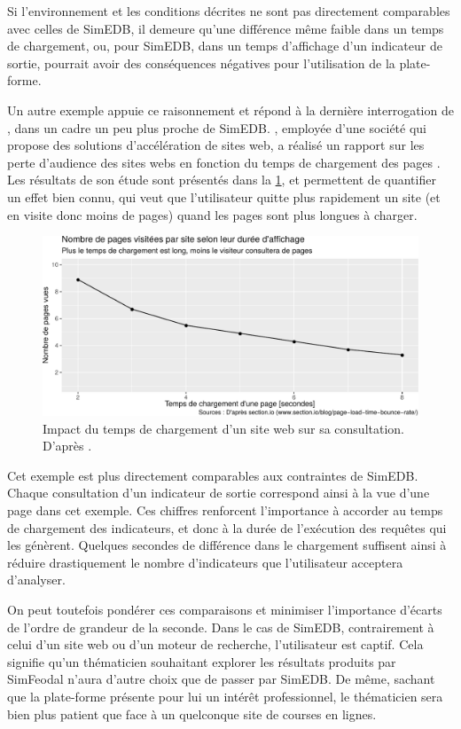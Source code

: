 Si l'environnement et les conditions décrites ne sont pas directement comparables avec celles de SimEDB, il demeure qu'une différence même faible dans un temps de chargement, ou, pour SimEDB, dans un temps d'affichage d'un indicateur de sortie, pourrait avoir des conséquences négatives pour l'utilisation de la plate-forme.

Un autre exemple appuie ce raisonnement et répond à la dernière interrogation de \citeauthor{patel_speed_2011}, dans un cadre un peu plus proche de SimEDB.
, employée d'une société qui propose des solutions d'accélération de sites web, a réalisé un rapport sur les perte d'audience des sites webs en fonction du temps de chargement des pages \autocite{elliott_how_2017}.
Les résultats de son étude sont présentés dans la \cref{fig:page-abandon}, et permettent de quantifier un effet bien connu, qui veut que l'utilisateur quitte plus rapidement un site (et en visite donc moins de pages) quand les pages sont plus longues à charger.

\begin{figure}[H]
	\centering
	\includegraphics[width=.9\linewidth]{img/abandon_pages.pdf}
	\caption{Impact du temps de chargement d'un site web sur sa consultation. D'après \textcite{elliott_how_2017}.}
	\label{fig:page-abandon}
\end{figure}

Cet exemple est plus directement comparables aux contraintes de SimEDB.
Chaque consultation d'un indicateur de sortie correspond ainsi à la vue d'une page dans cet exemple.
Ces chiffres renforcent l'importance à accorder au temps de chargement des indicateurs, et donc à la durée de l'exécution des requêtes qui les génèrent.
Quelques secondes de différence dans le chargement suffisent ainsi à réduire drastiquement le nombre d'indicateurs que l'utilisateur acceptera d'analyser.

On peut toutefois pondérer ces comparaisons et minimiser l'importance d'écarts de l'ordre de grandeur de la seconde.
Dans le cas de SimEDB, contrairement à celui d'un site web ou d'un moteur de recherche, l'utilisateur est \og captif\fg{}.
Cela signifie qu'un thématicien souhaitant explorer les résultats produits par SimFeodal n'aura d'autre choix que de passer par SimEDB.
De même, sachant que la plate-forme présente pour lui un intérêt professionnel, le thématicien sera bien plus patient que face à un quelconque site de courses en lignes.

